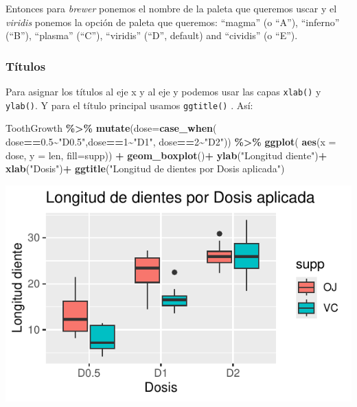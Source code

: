 \documentclass[
]{book}
\newenvironment{Shaded}{\begin{snugshade}}{\end{snugshade}}
\newcommand{\AttributeTok}[1]{\textcolor[rgb]{0.13,0.29,0.53}{#1}}
\newcommand{\DecValTok}[1]{\textcolor[rgb]{0.00,0.00,0.81}{#1}}
\newcommand{\FloatTok}[1]{\textcolor[rgb]{0.00,0.00,0.81}{#1}}
\newcommand{\FunctionTok}[1]{\textcolor[rgb]{0.13,0.29,0.53}{\textbf{#1}}}
\newcommand{\NormalTok}[1]{#1}
\newcommand{\SpecialCharTok}[1]{\textcolor[rgb]{0.81,0.36,0.00}{\textbf{#1}}}
\newcommand{\StringTok}[1]{\textcolor[rgb]{0.31,0.60,0.02}{#1}}
\begin{document}
\hfill\break

Entonces para \emph{brewer} ponemos el nombre de la paleta que queremos uscar y el \emph{viridis} ponemos la opción de paleta que queremos: ``magma'' (o ``A''), ``inferno'' (``B''), ``plasma'' (``C''), ``viridis'' (``D'', default) and ``cividis'' (o ``E'').

\subsubsection{Títulos}\label{tuxedtulos}

Para asignar los títulos al eje x y al eje y podemos usar las capas \texttt{xlab()} y \texttt{ylab()}.
Y para el título principal usamos \texttt{ggtitle()} .
Así:

\begin{Shaded}
\begin{Highlighting}[]
\NormalTok{ToothGrowth }\SpecialCharTok{\%\textgreater{}\%}  \FunctionTok{mutate}\NormalTok{(}\AttributeTok{dose=}\FunctionTok{case\_when}\NormalTok{(}
\NormalTok{  dose}\SpecialCharTok{==}\FloatTok{0.5}\SpecialCharTok{\textasciitilde{}}\StringTok{"D0.5"}\NormalTok{,dose}\SpecialCharTok{==}\DecValTok{1}\SpecialCharTok{\textasciitilde{}}\StringTok{"D1"}\NormalTok{, dose}\SpecialCharTok{==}\DecValTok{2}\SpecialCharTok{\textasciitilde{}}\StringTok{"D2"}\NormalTok{)) }\SpecialCharTok{\%\textgreater{}\%} \FunctionTok{ggplot}\NormalTok{(}
    \FunctionTok{aes}\NormalTok{(}\AttributeTok{x =}\NormalTok{ dose, }\AttributeTok{y =}\NormalTok{ len, }\AttributeTok{fill=}\NormalTok{supp)) }\SpecialCharTok{+}  \FunctionTok{geom\_boxplot}\NormalTok{()}\SpecialCharTok{+}
  \FunctionTok{ylab}\NormalTok{(}\StringTok{"Longitud diente"}\NormalTok{)}\SpecialCharTok{+}
  \FunctionTok{xlab}\NormalTok{(}\StringTok{"Dosis"}\NormalTok{)}\SpecialCharTok{+}
  \FunctionTok{ggtitle}\NormalTok{(}\StringTok{"Longitud de dientes por Dosis aplicada"}\NormalTok{)}
\end{Highlighting}
\end{Shaded}

\begin{center}\includegraphics{_main_files/figure-latex/unnamed-chunk-216-1} \end{center}
\end{document}
